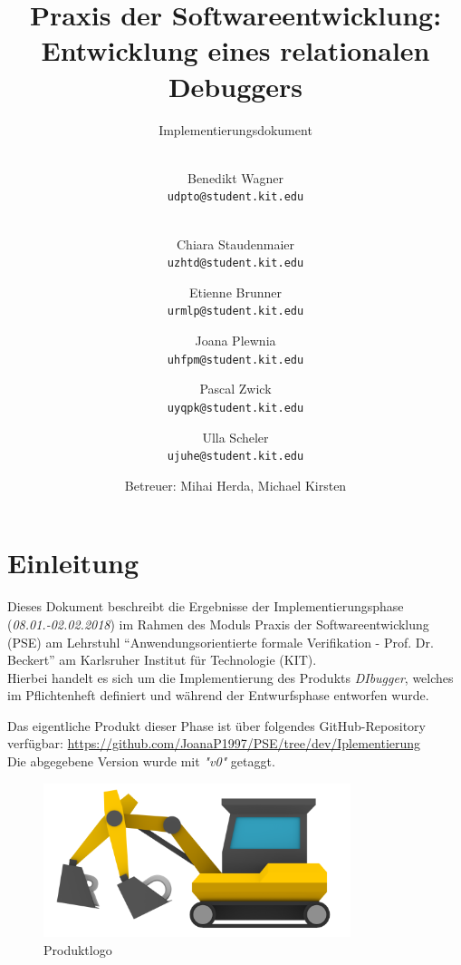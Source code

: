 \documentclass[parskip=full]{scrartcl}
\title{
	\vspace{2cm}
	\myfont 
	Praxis der Softwareentwicklung:\\ 
	Entwicklung eines relationalen Debuggers\\
}
\subtitle{
	\vspace{1cm}
	\myfont
	Implementierungsdokument
}
\author{
	\vspace{1cm} \\
	Benedikt Wagner\\
	\texttt{udpto@student.kit.edu}
	\and \vspace{1cm} \\ Chiara Staudenmaier\\
	\texttt{uzhtd@student.kit.edu}
	\and Etienne Brunner\\
	\texttt{urmlp@student.kit.edu}
	\and Joana Plewnia\\
	\texttt{uhfpm@student.kit.edu} 
	\and Pascal Zwick\\
	\texttt{uyqpk@student.kit.edu}
	\and Ulla Scheler\\
	\texttt{ujuhe@student.kit.edu}
	\vspace{1cm}
	\and Betreuer: Mihai Herda, Michael Kirsten
	\vspace{4cm}
}
\begin{document}
\clearpage
\maketitle
{}
\newpage

\tableofcontents
\newpage
{}

\section{Einleitung}
Dieses Dokument beschreibt die Ergebnisse der Implementierungsphase (\textit{08.01.-02.02.2018}) im Rahmen des Moduls Praxis der Softwareentwicklung (PSE) am Lehrstuhl \enquote{Anwendungsorientierte formale Verifikation - Prof. Dr. Beckert} am Karlsruher Institut für Technologie (KIT).\\
Hierbei handelt es sich um die Implementierung des Produkts \textit{DIbugger}, welches im Pflichtenheft definiert und während der Entwurfsphase entworfen wurde.

Das eigentliche Produkt dieser Phase ist über folgendes GitHub-Repository verfügbar: \href{https://github.com/JoanaP1997/PSE/tree/dev/Iplementierung}{https://github.com/JoanaP1997/PSE/tree/dev/Iplementierung} \\
Die abgegebene Version wurde mit \textit{"v0"} getaggt.

\begin{figure}[!h]
\centering
\includegraphics[width=0.8\textwidth]{../Plichtenheft/logo_nongi.png}
\caption{Produktlogo}
\end{figure}
\end{document}
